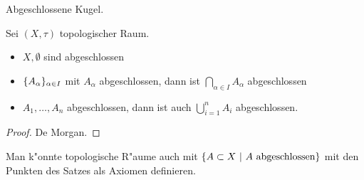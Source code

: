 \begin{bsp}
    Abgeschlossene Kugel.
\end{bsp}

\begin{stz}[Dualsatz]
    Sei $(X,\tau)$ topologischer Raum.
    \begin{itemize}
     \item $X, \emptyset$ sind abgeschlossen
     \item $\mdef{A_\alpha}_{\alpha\in I}$ mit $A_\alpha$ abgeschlossen, dann ist
        $\bigcap_{\alpha\in I} A_\alpha$ abgeschlossen
     \item $A_1,\ldots, A_n$ abgeschlossen, dann ist auch $\bigcup_{i=1}^n A_i$
        abgeschlossen.
    \end{itemize}
    \begin{proof}
        De Morgan.
    \end{proof}
    \begin{bem}
        Man k"onnte topologische R"aume auch mit $\mdef[A\subset X]{A\text{ abgeschlossen}}$
        mit den Punkten des Satzes als Axiomen definieren.
    \end{bem}
\end{stz}